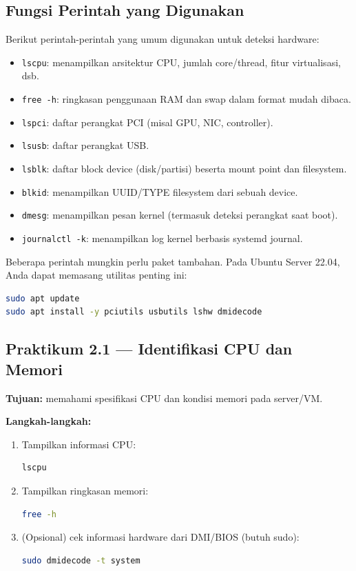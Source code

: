 \subsection*{Fungsi Perintah yang Digunakan}
Berikut perintah-perintah yang umum digunakan untuk deteksi hardware:
\begin{itemize}
    \item \texttt{lscpu}: menampilkan arsitektur CPU, jumlah core/thread, fitur virtualisasi, dsb.
    \item \texttt{free -h}: ringkasan penggunaan RAM dan swap dalam format mudah dibaca.
    \item \texttt{lspci}: daftar perangkat PCI (misal GPU, NIC, controller).
    \item \texttt{lsusb}: daftar perangkat USB.
    \item \texttt{lsblk}: daftar block device (disk/partisi) beserta mount point dan filesystem.
    \item \texttt{blkid}: menampilkan UUID/TYPE filesystem dari sebuah device.
    \item \texttt{dmesg}: menampilkan pesan kernel (termasuk deteksi perangkat saat boot).
    \item \texttt{journalctl -k}: menampilkan log kernel berbasis systemd journal.
\end{itemize}

\begin{tipbox}
Beberapa perintah mungkin perlu paket tambahan. Pada Ubuntu Server 22.04, Anda dapat memasang utilitas penting ini:
\begin{lstlisting}[language=bash]
sudo apt update
sudo apt install -y pciutils usbutils lshw dmidecode
\end{lstlisting}
\end{tipbox}

\subsection*{Praktikum 2.1 --- Identifikasi CPU dan Memori}
\textbf{Tujuan:} memahami spesifikasi CPU dan kondisi memori pada server/VM.

\textbf{Langkah-langkah:}
\begin{enumerate}
    \item Tampilkan informasi CPU:
\begin{lstlisting}[language=bash, caption={Melihat informasi CPU}]
lscpu
\end{lstlisting}

    \item Tampilkan ringkasan memori:
\begin{lstlisting}[language=bash, caption={Melihat penggunaan memori}]
free -h
\end{lstlisting}

    \item (Opsional) cek informasi hardware dari DMI/BIOS (butuh sudo):
\begin{lstlisting}[language=bash, caption={Informasi DMI (opsional)}]
sudo dmidecode -t system
\end{lstlisting}
\end{enumerate}

